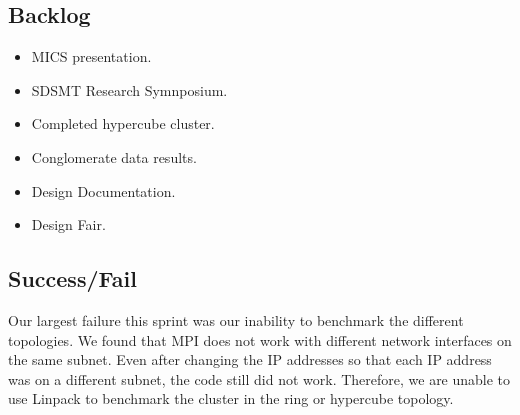 \subsection{Backlog}

\begin{itemize}
\item MICS presentation.
\item SDSMT Research Symnposium.
\item Completed hypercube cluster.
\item Conglomerate data results.
\item Design Documentation.
\item Design Fair.
\end{itemize}

\subsection{Success/Fail}

Our largest failure this sprint was our inability to benchmark the different topologies. We found that MPI does not work with different network interfaces on the same subnet. Even after changing the IP addresses so that each IP address was on a different subnet, the code still did not work. Therefore, we are unable to use Linpack to benchmark the cluster in the ring or hypercube topology.
